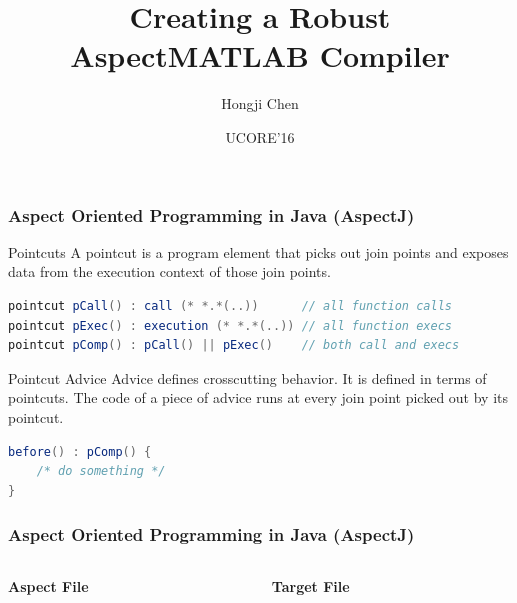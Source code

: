 \documentclass[10pt]{beamer}
\title{Creating a Robust AspectMATLAB Compiler}
\author{Hongji Chen}
\date[September 1, 2016]{UCORE'16}
\begin{document}
\frame{\maketitle}

\begin{frame}[fragile]
\frametitle{Aspect Oriented Programming in Java (AspectJ)}
\begin{block}{Pointcuts}
A pointcut is a program element that picks out join points and exposes data
from the execution context of those join points. \cite{aspectjOnlinePointcut}

\begin{lstlisting}[basicstyle=\small, language=Java]
pointcut pCall() : call (* *.*(..))      // all function calls
pointcut pExec() : execution (* *.*(..)) // all function execs
pointcut pComp() : pCall() || pExec()    // both call and execs
\end{lstlisting}

\end{block}

\begin{block}{Pointcut Advice}
Advice defines crosscutting behavior. It is defined in terms of pointcuts. The
code of a piece of advice runs at every join point picked out by its pointcut. 
\cite{aspectjOnlineAdvice}

\begin{lstlisting}[basicstyle=\small, language=Java]
before() : pComp() {
    /* do something */
}
\end{lstlisting}
\end{block}
\end{frame}

\begin{frame}
\frametitle{Aspect Oriented Programming in Java (AspectJ)}
\begin{columns}
    \begin{column}[T]{0.5\textwidth}
    \textbf{Aspect File}
      
    \end{column}
    \begin{column}[T]{0.5\textwidth}
    \textbf{Target File}
      
    \end{column}
\end{columns}
\pause
    
 
\end{frame}
\end{document}
